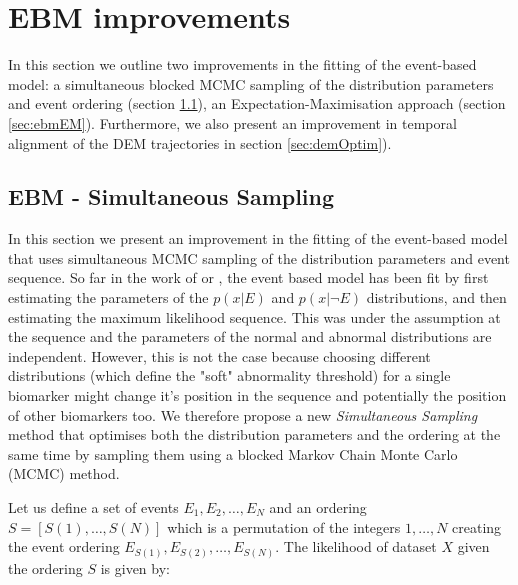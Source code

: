 \section{EBM improvements}
\label{sec:ebmImprovements}

In this section we outline two improvements in the fitting of the event-based model: a simultaneous blocked MCMC sampling of the distribution parameters and event ordering (section \ref{sec:simultSampling}), an Expectation-Maximisation approach (section \ref{sec:ebmEM}). Furthermore, we also present an improvement in temporal alignment of the DEM trajectories in section \ref{sec:demOptim}). 

\subsection{EBM - Simultaneous Sampling}
\label{sec:simultSampling}

In this section we present an improvement in the fitting of the event-based model that uses simultaneous MCMC sampling of the distribution parameters and event sequence. So far in the work of \cite{fonteijn2012event} or \cite{young2014data}, the event based model has been fit by first estimating the parameters of the $p(x|E)$ and $p(x|\neg E)$ distributions, and then estimating the maximum likelihood sequence. This was under the assumption at the sequence and the parameters of the normal and abnormal distributions are independent. However, this is not the case because choosing different distributions (which define the "soft" abnormality threshold) for a single biomarker might change it's position in the sequence and potentially the position of other biomarkers too. We therefore propose a new \emph{Simultaneous Sampling} method that optimises both the distribution parameters and the ordering at the same time by sampling them using a blocked Markov Chain Monte Carlo (MCMC) method. 

Let us define a set of events $E_1, E_2, \dots , E_N$ and an ordering $S = [S(1), \dots, S(N)]$ which is a permutation of the integers $1,\dots, N$ creating the event ordering $E_{S(1)}, E_{S(2)},\dots, E_{S(N)}$. The likelihood of dataset $X$ given the ordering $S$ is given by:

